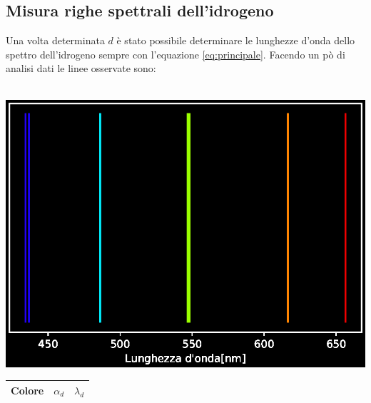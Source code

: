 \documentclass[10pt,a4paper]{article}
\begin{document}
	\subsection*{Misura righe spettrali dell'idrogeno}
		Una volta determinata $d$ è stato possibile determinare le lunghezze d'onda dello spettro dell'idrogeno sempre con l'equazione \ref{eq:principale}.
		Facendo un pò di analisi dati le linee osservate sono:\\\\
		\begin{minipage}{.45\linewidth}
			\centering
			\includegraphics[width=\linewidth]{parte-2/immagini/idrogeno.eps}
		\end{minipage}
		\begin{minipage}{.45\linewidth}
		\begin{tabular}{ccc}
			\hline
			Colore & $\alpha_d$ & $\lambda_d$\\
			\hline
			
			\hline
		\end{tabular}
		\end{minipage}
\end{document}
